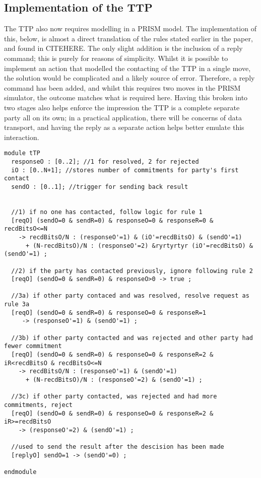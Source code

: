 \documentclass{l4proj}
\begin{document}
\subsection{Implementation of the TTP}

The TTP also now requires modelling in a PRISM model. The implementation of this, below, is almost a direct translation of the rules stated earlier in the paper, and found in CITEHERE. The only slight addition is the inclusion of a reply command; this is purely for reasons of simplicity. Whilst it is possible to implement an action that modelled the contacting of the TTP in a single move, the solution would be complicated and a likely source of error. Therefore, a reply command has been added, and whilst this requires two moves in the PRISM simulator, the outcome matches what is required here. Having this broken into two stages also helps enforce the impression the TTP is a complete separate party all on its own; in a practical application, there will be concerns of data transport, and having the reply as a separate action helps better emulate this interaction.
\begin{lstlisting}
module tTP
  responseO : [0..2]; //1 for resolved, 2 for rejected
  iO : [0..N+1]; //stores number of commitments for party's first contact
  sendO : [0..1]; //trigger for sending back result

        
  //1) if no one has contacted, follow logic for rule 1
  [reqO] (sendO=0 & sendR=0) & responseO=0 & responseR=0 & recdBitsO<=N 
    -> recdBitsO/N : (responseO'=1) & (iO'=recdBitsO) & (sendO'=1)  
      + (N-recdBitsO)/N : (responseO'=2) &ryrtyrtyr (iO'=recdBitsO) & (sendO'=1) ;

  //2) if the party has contacted previously, ignore following rule 2
  [reqO] (sendO=0 & sendR=0) & responseO>0 -> true ;
    
  //3a) if other party contaced and was resolved, resolve request as rule 3a
  [reqO] (sendO=0 & sendR=0) & responseO=0 & responseR=1 
     -> (responseO'=1) & (sendO'=1) ;

  //3b) if other party contacted and was rejected and other party had fewer commitment
  [reqO] (sendO=0 & sendR=0) & responseO=0 & responseR=2 & iR<recdBitsO & recdBitsO<=N 
    -> recdBitsO/N : (responseO'=1) & (sendO'=1) 
      + (N-recdBitsO)/N : (responseO'=2) & (sendO'=1) ;

  //3c) if other party contacted, was rejected and had more commitments, reject
  [reqO] (sendO=0 & sendR=0) & responseO=0 & responseR=2 & iR>=recdBitsO 
    -> (responseO'=2) & (sendO'=1) ;

  //used to send the result after the descision has been made
  [replyO] sendO=1 -> (sendO'=0) ;

endmodule

\end{lstlisting}
\end{document}
